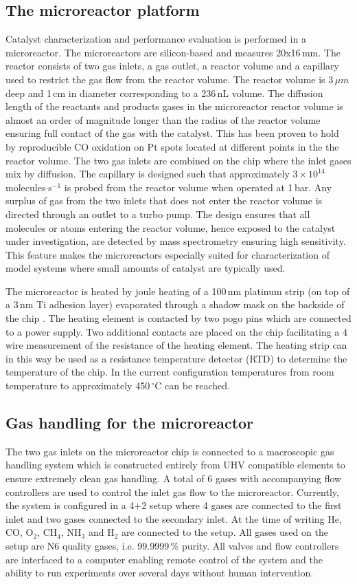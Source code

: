 \documentclass[aip,rsi]{revtex4-1}
\begin{document}
\subsection{The microreactor platform}
Catalyst characterization and performance evaluation is performed in a microreactor\cite{Henriksen2009}. The microreactors are silicon-based and measures 20x16\,mm. The reactor consists of two gas inlets, a gas outlet, a reactor volume and a capillary used to restrict the gas flow from the reactor volume. The reactor volume is 3\,$\mu m$ deep and 1\,cm in diameter corresponding to a 236\,nL volume. The diffusion length of the reactants and products gases in the microreactor reactor volume is almost an order of magnitude longer than the radius of the reactor volume ensuring full contact of the gas with the catalyst. This has been proven to hold by reproducible CO oxidation on Pt spots located at different points in the the reactor volume. The two gas inlets are combined on the chip where the inlet gases mix by diffusion. The capillary is designed such that approximately $3\times10^{14}$\,molecules$\cdot$s$^{-1}$ is probed from the reactor volume when operated at 1\,bar. Any surplus of gas from the two inlets that does not enter the reactor volume is directed through an outlet to a turbo pump. The design ensures that all molecules or atoms entering the reactor volume, hence exposed to the catalyst under investigation, are detected by mass spectrometry ensuring high sensitivity. This feature makes the microreactors especially suited for characterization of model systems where small amounts of catalyst are typically used. 

The microreactor is heated by joule heating of a 100\,nm platinum strip (on top of a 3\,nm Ti adhesion layer) evaporated through a shadow mask on the backside of the chip . The heating element is contacted by two pogo pins which are connected to a power supply. Two additional contacts are placed on the chip facilitating a 4 wire measurement of the resistance of the heating element. The heating strip can in this way be used as a resistance temperature detector (RTD) to determine the temperature of the chip. In the current configuration temperatures from room temperature to approximately 450\,$^{\circ}$C can be reached.

\subsection{Gas handling for the microreactor}
The two gas inlets on the microreactor chip is connected to a macroscopic gas handling system which is constructed entirely from UHV compatible elements to ensure extremely clean gas handling. A total of 6 gases with accompanying flow controllers are used to control the inlet gas flow to the microreactor. Currently, the system is configured in a 4+2 setup where 4 gases are connected to the first inlet and two gases connected to the secondary inlet. At the time of writing He, CO, O$_2$, CH$_4$, NH$_3$ and H$_2$ are connected to the setup. All gases used on the setup are N6 quality gases, i.e. 99.9999\,\% purity. All valves and flow controllers are interfaced to a computer enabling remote control of the system and the ability to run experiments over several days without human intervention.
\end{document}
